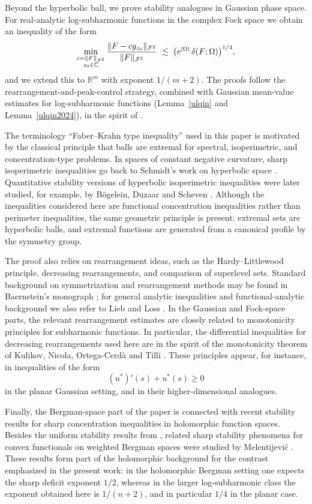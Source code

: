 \documentclass[a4paper,10pt]{amsart}
\newcommand{\Fock}{\mcalF^2}
\begin{document}
Beyond the hyperbolic ball, we prove stability analogues in Gaussian phase space.
For real-analytic log-subharmonic functions in the complex Fock space we obtain an inequality of
the form
\[
\min_{\substack{c=\|F\|_{\Fock}\\ z_0\in\mathbb C}}
\frac{\|F-cg_{z_0}\|_{\Fock}}{\|F\|_{\Fock}}
\;\lesssim\;
\bigl(e^{|\Omega|}\,\delta(F;\Omega)\bigr)^{1/4},
\]
and we extend this to $\mathbb R^m$ with exponent $1/(m+2)$.
The proofs follow the rearrangement-and-peak-control strategy, combined with Gaussian mean-value
estimates for log-subharmonic functions (Lemma~\ref{ulqin} and Lemma~\ref{ulqin2024}), in the spirit
of \cite{GomezGuerraRamosTilli2024}.
\begin{numrem}
The terminology ``Faber--Krahn type inequality'' used in this paper is
motivated by the classical principle that balls are extremal for spectral,
isoperimetric, and concentration-type problems. In spaces of constant
negative curvature, sharp isoperimetric inequalities go back to Schmidt's
work on hyperbolic space \cite{14}. Quantitative stability versions of
hyperbolic isoperimetric inequalities were later studied, for example, by
B\"ogelein, Duzaar and Scheven \cite{cvpde}. Although the inequalities
considered here are functional concentration inequalities rather than
perimeter inequalities, the same geometric principle is present: extremal
sets are hyperbolic balls, and extremal functions are generated from a
canonical profile by the symmetry group.

The proof also relies on rearrangement ideas, such as the
Hardy--Littlewood principle, decreasing rearrangements, and comparison of
superlevel sets. Standard background on symmetrization and rearrangement
methods may be found in Baernstein's monograph \cite{baernstein}; for
general analytic inequalities and functional-analytic background we also
refer to Lieb and Loss \cite{LiebLoss}. In the Gaussian and Fock-space
parts, the relevant rearrangement estimates are closely related to
monotonicity principles for subharmonic functions. In particular, the
differential inequalities for decreasing rearrangements used here are in
the spirit of the monotonicity theorem of Kulikov, Nicola,
Ortega-Cerd\`a and Tilli \cite{KulikovNicolaOrtegaCerdaTilli2025}. These
principles appear, for instance, in inequalities of the form
\[
        (u^*)'(s)+u^*(s)\ge 0
\]
in the planar Gaussian setting, and in their higher-dimensional analogues.

Finally, the Bergman-space part of the paper is connected with recent
stability results for sharp concentration inequalities in holomorphic
function spaces. Besides the uniform stability results from
\cite{GomezKalajMelentijevicRamos2025}, related sharp stability phenomena
for convex functionals on weighted Bergman spaces were studied by
Melentijevi\'c \cite{Melentijevic}. These results form part of the
holomorphic background for the contrast emphasized in the present work: in
the holomorphic Bergman setting one expects the sharp deficit exponent
\(1/2\), whereas in the larger log-subharmonic class the exponent obtained
here is \(1/(n+2)\), and in particular \(1/4\) in the planar case.
\end{numrem}
\end{document}
